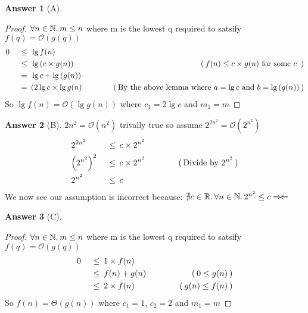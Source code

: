 \documentclass{article}
\theoremstyle{definition}
\newtheorem*{answer}{Answer}
\newcommand{\evidence}[1]{\ensuremath{\hspace{3em} (\hspace{0.2em} \text{#1} \hspace{0.2em})}}
\newcommand{\asymptotic}[3]{\ensuremath{#2 = #1(#3)}}
\newcommand{\bigO}[2]{\asymptotic{\mathcal{O}}{#1}{#2}}
\newcommand{\bigTheta}[2]{\asymptotic{\Theta}{#1}{#2}}
\newcommand{\relation}[1]{\ensuremath{\hspace{0.2em} {{} #1 {}} \hspace{0.2em}}}
\newcommand{\equal}{\relation{=}}
\newcommand{\lesseq}{\relation{\le}}
\newcommand{\parens}[1]{\left(#1\right)}
\newcommand{\quantify}[2]{\ensuremath{\forall #1 \in \mathbb{#2}. \hspace{0.2em}}}
\newcommand{\contra}{\ensuremath{\Rightarrow\!\Leftarrow}}
\begin{document}
\begin{answer}[A]
  \hfill
  \begin{proof}
    $\quantify{n}{N} m \le n$ where m is the lowest q required to satsify $\bigO{f(q)}{g(q)}$
    \begin{alignat*}{4}
      & 0  & \lesseq & \lg{f(n)}                   & {} \\
      & {} & \lesseq & \lg{\parens{c \times g(n)}} & \evidence{$f(n) \le  c \times g(n)$ for some $c$ } \\
      & {} & \equal  & \lg{c} + \lg{\parens{g(n)}} & {} \\
      & {} & \equal  & (2\lg{c} \times \lg{g(n)}   & \evidence{By the above lemma where $a = \lg{c}$ and $b = \lg{\parens{g(n)}}$}
  \end{alignat*}
  So $\bigO{\lg{f(n)}}{\lg{g(n)}}$ where $c_1 = 2\lg{c}$ and $m_1 = m$ \qedhere
  \end{proof}
  
\end{answer}

\begin{answer}[B]
  $\bigO{2n^2}{n^2}$ trivally true so assume $\bigO{2^{2n^2}}{2^{n^2}}$
  \begin{alignat*}{4}
      & 2^{2n^2}             & \lesseq & c \times 2^{n^2}                    & {} \\
      & {\parens{2^{n^2}}}^2 & \lesseq & c \times 2^{n^2}                    & \evidence{Divide by $2^{n^2}$} \\
      & 2^{n^2}              & \lesseq & c                                  & {}
  \end{alignat*}
  We now see our assumption is incorrect because:
  $\nexists c \in \mathbb{R}. \hspace{0.2em} \quantify{n}{N} 2^{n^2} \le c \hfill \contra$
\end{answer}

\begin{answer}[C]
  
  \hfill
  \begin{proof}
    $\quantify{n}{N} m \le n$ where m is the lowest q required to satsify $\bigO{f(q)}{g(q)}$
    \begin{alignat*}{4}
      & 0  & \lesseq & 1 \times f(n)          & {} \\
      & {} & \lesseq & f(n) + g(n)   & \evidence{$0 \le g(n)$} \\
      & {} & \lesseq & 2 \times f(n) & \evidence{$g(n) \le f(n)$}
    \end{alignat*}
    So $\bigTheta{f(n)}{g(n)}$ where $c_1 = 1$, $c_2 = 2$ and $m_1 = m$ \qedhere
  \end{proof}
\end{answer}
\end{document}
